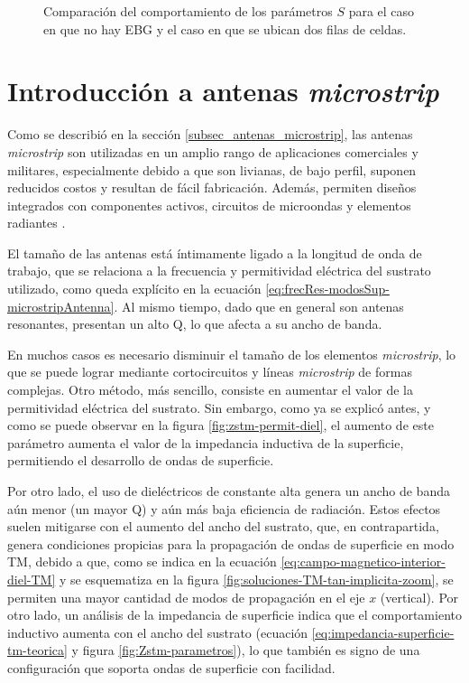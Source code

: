 \begin{figure}[h]
	\centering 
	\hspace{0pt}
	\caption{Comparación del comportamiento de los parámetros $S$ para el caso en que no hay EBG y el caso en que se ubican dos filas de celdas.}
	\label{fig:comparacion-23filas-ebg-mo}
\end{figure} 

	
\section{Introducción a antenas \textit{microstrip}}

Como se describió en la sección \ref{subsec_antenas_microstrip}, las antenas \textit{microstrip} son utilizadas en un amplio rango de aplicaciones comerciales y militares, especialmente debido a que son livianas, de bajo perfil, suponen reducidos costos y resultan de fácil fabricación. Además, permiten diseños integrados con componentes activos, circuitos de microondas y elementos radiantes \cite{Yang:EBGAntennas}.

El tamaño de las antenas está íntimamente ligado a la longitud de onda de trabajo, que se relaciona a la frecuencia y permitividad eléctrica del sustrato utilizado, como queda explícito en la ecuación \ref{eq:frecRes-modosSup-microstripAntenna}. Al mismo tiempo, dado que en general son antenas resonantes, presentan un alto Q, lo que afecta a su ancho de banda.

En muchos casos es necesario disminuir el tamaño de los elementos \textit{microstrip}, lo que se puede lograr mediante cortocircuitos y líneas \textit{microstrip} de formas complejas. Otro método, más sencillo, consiste en aumentar el valor de la permitividad eléctrica del sustrato. Sin embargo, como ya se explicó antes, y como se puede observar en la figura \ref{fig:zstm-permit-diel}, el aumento de este parámetro aumenta el valor de la impedancia inductiva de la superficie, permitiendo el desarrollo de ondas de superficie.

Por otro lado, el uso de dieléctricos de constante alta genera un ancho de banda aún menor (un mayor Q) y aún más baja eficiencia de radiación. Estos efectos suelen mitigarse con el aumento del ancho del sustrato, que, en contrapartida, genera condiciones propicias para la propagación de ondas de superficie en modo TM, debido a que, como se indica en la ecuación \ref{eq:campo-magnetico-interior-diel-TM} y se esquematiza en la figura \ref{fig:soluciones-TM-tan-implicita-zoom}, se permiten una mayor cantidad de modos de propagación en el eje $x$ (vertical). Por otro lado, un análisis de la impedancia de superficie indica que el comportamiento inductivo aumenta con el ancho del sustrato (ecuación \ref{eq:impedancia-superficie-tm-teorica} y figura \ref{fig:Zstm-parametros}), lo que también es signo de una configuración que soporta ondas de superficie con facilidad.

